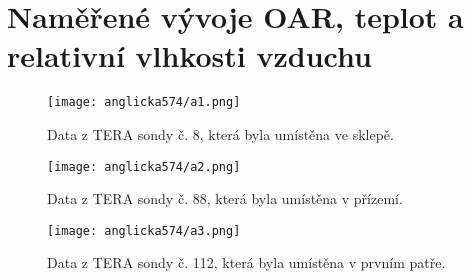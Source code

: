 \section{Naměřené vývoje OAR, teplot a relativní vlhkosti vzduchu}
\begin{figure}[ht]
    \centering
    \texttt{[image: anglicka574/a1.png]}
    \caption{Data z TERA sondy č. 8, která byla umístěna ve sklepě.}
    \label{fig:anglicka574_a1}
\end{figure}
\begin{figure}[ht]
    \centering
    \texttt{[image: anglicka574/a2.png]}
    \caption{Data z TERA sondy č. 88, která byla umístěna v přízemí.}
    \label{fig:anglicka574_a2}
\end{figure}
\begin{figure}[ht]
    \centering
    \texttt{[image: anglicka574/a3.png]}
    \caption{Data z TERA sondy č. 112, která byla umístěna v prvním patře.}
    \label{fig:anglicka574_a3}
\end{figure}

